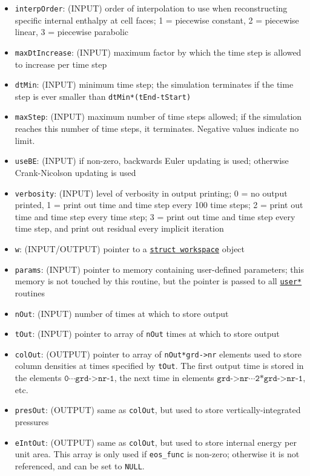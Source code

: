 \documentclass[12pt]{article}
\begin{document}
\begin{itemize}
\item \texttt{interpOrder}: (INPUT) order of interpolation to use when reconstructing specific internal enthalpy at cell faces; 1 = piecewise constant, 2 = piecewise linear, 3 = piecewise parabolic
\item \texttt{maxDtIncrease}: (INPUT) maximum factor by which the time step is allowed to increase per time step
\item \texttt{dtMin}: (INPUT) minimum time step; the simulation terminates if the time step is ever smaller than \verb=dtMin*(tEnd-tStart)=
\item \texttt{maxStep}: (INPUT) maximum number of time steps allowed; if the simulation reaches this number of time steps, it terminates. Negative values indicate no limit.
\item \texttt{useBE}: (INPUT) if non-zero, backwards Euler updating is used; otherwise Crank-Nicolson updating is used
\item \texttt{verbosity}: (INPUT) level of verbosity in output printing; 0 = no output printed, 1 = print out time and time step every 100 time steps; 2 = print out time and time step every time step; 3 = print out time and time step every time step, and print out residual every implicit iteration
\item \texttt{w}: (INPUT/OUTPUT) pointer to a \hyperref[sssec:datastructures]{\texttt{struct workspace}} object
\item \texttt{params}: (INPUT) pointer to memory containing user-defined parameters; this memory is not touched by this routine, but the pointer is passed to all \hyperref[sssec:userAlpha]{\texttt{user*}} routines
\item \texttt{nOut}: (INPUT) number of times at which to store output
\item \texttt{tOut}: (INPUT) pointer to array of \verb=nOut= times at which to store output
\item \texttt{colOut}: (OUTPUT) pointer to array of \verb=nOut*grd->nr= elements used to store column densities at times specified by \verb=tOut=. The first output time is stored in the elements $\texttt{0}\cdots\texttt{grd->nr-1}$, the next time in elements $\texttt{grd->nr}\cdots\texttt{2*grd->nr-1}$, etc.
\item \texttt{presOut}: (OUTPUT) same as \verb=colOut=, but used to store vertically-integrated pressures
\item \texttt{eIntOut}: (OUTPUT) same as \verb=colOut=, but used to store internal energy per unit area. This array is only used if \verb=eos_func= is non-zero; otherwise it is not referenced, and can be set to \verb=NULL=.

\end{itemize}
\end{document}
